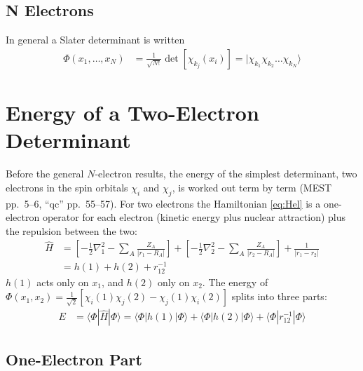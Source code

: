 \subsection{N Electrons}

In general a Slater determinant is written
\begin{align*}
\Phi(x_1, \dots, x_N) &= \frac{1}{\sqrt{N!}} \det[\chi_{k_j}(x_i)] = |\chi_{k_1} \chi_{k_2} \dots \chi_{k_N}\rangle
\end{align*}

\section{Energy of a Two-Electron Determinant}

Before the general $N$-electron results, the energy of the simplest determinant, two electrons in the spin orbitals $\chi_i$ and $\chi_j$, is worked out term by term (MEST pp.~5--6, “qc” pp.~55--57). For two electrons the Hamiltonian \eqref{eq:Hel} is a one-electron operator for each electron (kinetic energy plus nuclear attraction) plus the repulsion between the two:
\begin{align*}
\hat{H} &= \left[ -\frac{1}{2} \nabla_1^2 - \sum_A \frac{Z_A}{|r_1 - R_A|} \right] + \left[ -\frac{1}{2} \nabla_2^2 - \sum_A \frac{Z_A}{|r_2 - R_A|} \right] + \frac{1}{|r_1 - r_2|} \\
&= h(1) + h(2) + r_{12}^{-1}
\end{align*}
$h(1)$ acts only on $x_1$, and $h(2)$ only on $x_2$. The energy of $\Phi(x_1, x_2) = \frac{1}{\sqrt{2}} [\chi_i(1) \chi_j(2) - \chi_j(1) \chi_i(2)]$ splits into three parts:
\begin{align*}
E &= \langle \Phi|\hat{H}|\Phi\rangle = \langle \Phi|h(1)|\Phi\rangle + \langle \Phi|h(2)|\Phi\rangle + \langle \Phi|r_{12}^{-1}|\Phi\rangle
\end{align*}

\subsection{One-Electron Part}

